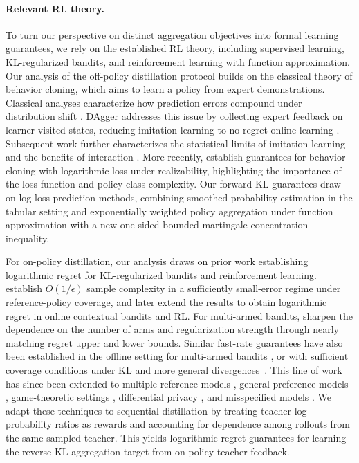 \documentclass[11pt]{article}
\begin{document}
\paragraph{Relevant RL theory.}
To turn our perspective on distinct aggregation objectives into formal learning guarantees, we rely on the established RL theory, including supervised learning, KL-regularized bandits, and reinforcement learning with function approximation. Our analysis of the off-policy distillation protocol builds on the classical theory of behavior cloning, which aims to learn a policy from expert demonstrations. Classical analyses characterize how prediction errors compound under distribution shift \citep{syed2010reduction,ross2010efficient}. DAgger addresses this issue by collecting expert feedback on learner-visited states, reducing imitation learning to no-regret online learning \citep{ross2011reduction}. Subsequent work further characterizes the statistical limits of imitation learning and the benefits of interaction \citep{rajaraman2020toward,rajaraman2021value}. More recently, \citet{foster2024behavior} establish guarantees for behavior cloning with logarithmic loss under realizability, highlighting the importance of the loss function and policy-class complexity. Our forward-KL guarantees draw on log-loss prediction methods, combining smoothed probability estimation in the tabular setting and exponentially weighted policy aggregation under function approximation with a new one-sided bounded martingale concentration inequality.

For on-policy distillation, our analysis draws on prior work establishing logarithmic regret for KL-regularized bandits and reinforcement learning. \citet{zhao2026sharp} establish $O(1/\epsilon)$ sample complexity in a sufficiently small-error regime under reference-policy coverage, and later \citet{zhao2025logarithmic} extend the results to obtain logarithmic regret in online contextual bandits and RL. For multi-armed bandits, \citet{ji2026near} sharpen the dependence on the number of arms and regularization strength through nearly matching regret upper and lower bounds. Similar fast-rate guarantees have also been established in the offline setting for multi-armed bandits \citep{ji2026optimal}, or with sufficient coverage conditions under KL and more general divergences~\citep{zhao2026towards,zhao2026fast}. This line of work has since been extended to multiple reference models \citep{aminian2026kl}, general preference models \citep{wu2026greedy}, game-theoretic settings \citep{nayak2025achieving}, differential privacy \citep{wu2025offline}, and misspecified models \citep{hong2026online}. We adapt these techniques to sequential distillation by treating teacher log-probability ratios as rewards and accounting for dependence among rollouts from the same sampled teacher. This yields logarithmic regret guarantees for learning the reverse-KL aggregation target from on-policy teacher feedback.
\end{document}
